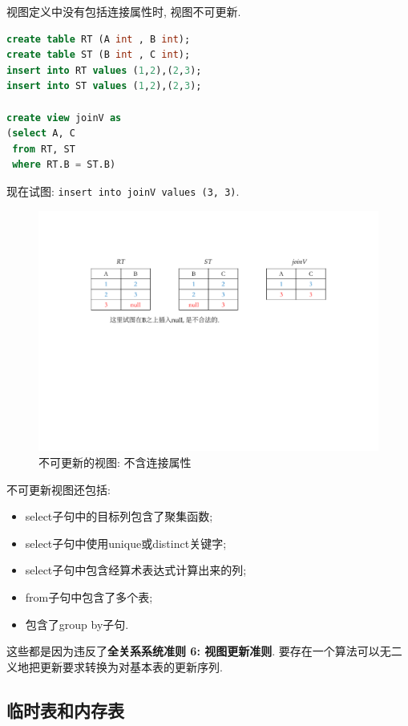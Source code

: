\begin{theorem}
  视图定义中没有包括连接属性时, 视图不可更新.
\end{theorem}

\begin{lstlisting}[language=SQL]
create table RT (A int , B int);
create table ST (B int , C int);
insert into RT values (1,2),(2,3);
insert into ST values (1,2),(2,3);

create view joinV as
(select A, C
 from RT, ST
 where RT.B = ST.B)
\end{lstlisting}

现在试图: \verb|insert into joinV values (3, 3)|.

\begin{figure}[H]
    \centering
    \includegraphics[width=.8\textwidth]{figure/不合法的视图更新.pdf}
    \caption{不可更新的视图: 不含连接属性}
\end{figure}

不可更新视图还包括:
\begin{itemize}
  \item select子句中的目标列包含了聚集函数;
  \item select子句中使用unique或distinct关键字;
  \item select子句中包含经算术表达式计算出来的列;
  \item from子句中包含了多个表;
  \item 包含了group by子句.
\end{itemize}

这些都是因为违反了\textbf{全关系系统准则 6: 视图更新准则}. 要存在一个算法可以无二
义地把更新要求转换为对基本表的更新序列.

\subsection{临时表和内存表}

